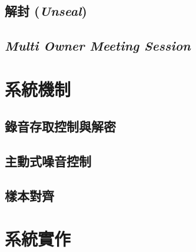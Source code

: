 \subsection{解封 ({\it Unseal})}


\subsection{{\it Multi Owner Meeting Session}}


\section{系統機制}

\subsection{錄音存取控制與解密}

\subsection{主動式噪音控制}

\subsection{樣本對齊}

\section{系統實作}